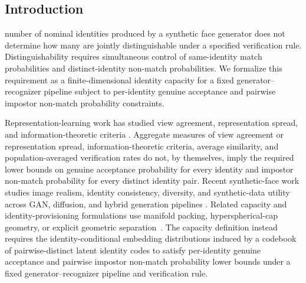 \documentclass[journal]{IEEEtran}
\begin{document}
\begin{bibunit}
\section{Introduction}
\label{sec:introduction}

 number of nominal identities produced by a synthetic face generator does not determine how many are jointly distinguishable under a specified verification rule. Distinguishability requires simultaneous control of same-identity match probabilities and distinct-identity non-match probabilities. We formalize this requirement as a finite-dimensional identity capacity for a fixed generator--recognizer pipeline subject to per-identity genuine acceptance and pairwise impostor non-match probability constraints.

Representation-learning work has studied view agreement, representation spread, and information-theoretic criteria \cite{galvez2023role, oord2018representation, bachman2019learning, wang2020understanding, wu2020mutual, shwartz2023information, yerxa2023learning, isik2023information, schaeffer2024towards, razeghi2026deep}. Aggregate measures of view agreement or representation spread, information-theoretic criteria, average similarity, and population-averaged verification rates do not, by themselves, imply the required lower bounds on genuine acceptance probability for every identity and impostor non-match probability for every distinct identity pair. Recent synthetic-face work studies image realism, identity consistency, diversity, and synthetic-data utility across GAN, diffusion, and hybrid generation pipelines \cite{qiu2021synface, colbois2021use, kim2023dcface, melzi2023gandiffface, boutros2023synthetic, sun2024cemiface, shahreza2025hyperface, rahimi2024synthetic, caldeira2025negfacediff, kim2025vigface}. Related capacity and identity-provisioning formulations use manifold packing, hyperspherical-cap geometry, or explicit geometric separation~\cite{gong2017capacity,boddeti2023biometric,ji2026bip}. The capacity definition instead requires the identity-conditional embedding distributions induced by a codebook of pairwise-distinct latent identity codes to satisfy per-identity genuine acceptance and pairwise impostor non-match probability lower bounds under a fixed generator--recognizer pipeline and verification rule.


\end{bibunit}
\end{document}
